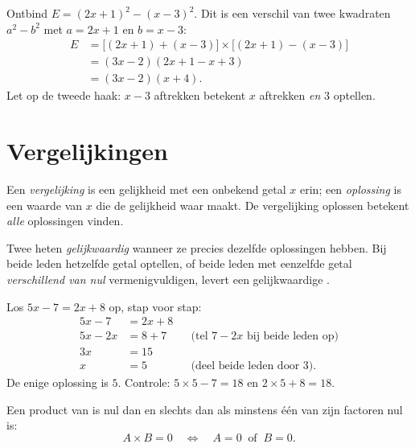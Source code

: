 \begin{example}\label{ex:g10:algebra:factorsteps}
Ontbind $E = (2x + 1)^2 - (x - 3)^2$. Dit is een verschil van twee kwadraten
$a^2 - b^2$ met $a = 2x+1$ en $b = x-3$:
\begin{align*}
E &= \bigl[(2x+1) + (x-3)\bigr] \times \bigl[(2x+1) - (x-3)\bigr] \\
  &= (3x - 2)(2x + 1 - x + 3) \\
  &= (3x - 2)(x + 4).
\end{align*}
Let op de tweede haak: $x - 3$ aftrekken betekent $x$ aftrekken \emph{en}
$3$ optellen.
\end{example}

\section{Vergelijkingen}

\begin{definition}\label{def:g10:algebra:equation}
Een \emph{vergelijking} is een gelijkheid met een
onbekend getal $x$ erin; een \emph{oplossing} is een waarde van $x$ die de
gelijkheid waar maakt. De vergelijking oplossen betekent \emph{alle}
oplossingen vinden.
\end{definition}

Twee  heten \emph{gelijkwaardig} wanneer ze precies dezelfde
oplossingen hebben. Bij beide leden hetzelfde getal optellen, of beide leden
met eenzelfde getal \emph{verschillend van nul} vermenigvuldigen, levert een
gelijkwaardige .

\begin{example}\label{ex:g10:algebra:firstdegree}
Los $5x - 7 = 2x + 8$ op, stap voor stap:
\begin{align*}
5x - 7 &= 2x + 8 \\
5x - 2x &= 8 + 7 && \text{(tel $7 - 2x$ bij beide leden op)} \\
3x &= 15 \\
x &= 5 && \text{(deel beide leden door $3$).}
\end{align*}
De enige oplossing is $5$. Controle: $5 \times 5 - 7 = 18$ en
$2 \times 5 + 8 = 18$.
\end{example}

\begin{theorem}[Nulproductregel]\label{thm:g10:algebra:zeroproduct}
Een product van  is nul dan en slechts dan als minstens één van
zijn factoren nul is:
\[
A \times B = 0
\quad\Longleftrightarrow\quad
A = 0 \ \text{ of } \ B = 0 .
\]
\end{theorem}

